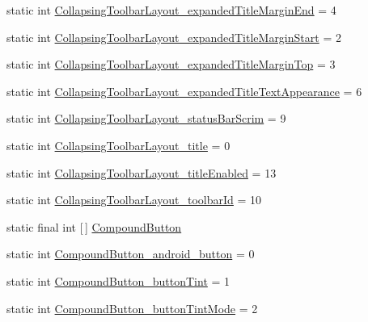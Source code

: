 \begin{DoxyCompactItemize}
\item 
static int \hyperlink{classandroid_1_1support_1_1v7_1_1cardview_1_1R_1_1styleable_a9ba764a19d59fb616535b8b928a3ab0c}{Collapsing\+Toolbar\+Layout\+\_\+expanded\+Title\+Margin\+End} = 4
\item 
static int \hyperlink{classandroid_1_1support_1_1v7_1_1cardview_1_1R_1_1styleable_a9da9e2540ee41e2bf5cf6e02ca2d940f}{Collapsing\+Toolbar\+Layout\+\_\+expanded\+Title\+Margin\+Start} = 2
\item 
static int \hyperlink{classandroid_1_1support_1_1v7_1_1cardview_1_1R_1_1styleable_adb4d112ba91dd0c5abf011eb88af2a2b}{Collapsing\+Toolbar\+Layout\+\_\+expanded\+Title\+Margin\+Top} = 3
\item 
static int \hyperlink{classandroid_1_1support_1_1v7_1_1cardview_1_1R_1_1styleable_a216b5b490333f10034ece0d07367bcf2}{Collapsing\+Toolbar\+Layout\+\_\+expanded\+Title\+Text\+Appearance} = 6
\item 
static int \hyperlink{classandroid_1_1support_1_1v7_1_1cardview_1_1R_1_1styleable_ac95b8a59eb9582467255c194e9d8546c}{Collapsing\+Toolbar\+Layout\+\_\+status\+Bar\+Scrim} = 9
\item 
static int \hyperlink{classandroid_1_1support_1_1v7_1_1cardview_1_1R_1_1styleable_a7bb1d248c841d16154184e1f8bbc0581}{Collapsing\+Toolbar\+Layout\+\_\+title} = 0
\item 
static int \hyperlink{classandroid_1_1support_1_1v7_1_1cardview_1_1R_1_1styleable_ac3162e6203b6488dcc98da969976ddda}{Collapsing\+Toolbar\+Layout\+\_\+title\+Enabled} = 13
\item 
static int \hyperlink{classandroid_1_1support_1_1v7_1_1cardview_1_1R_1_1styleable_aa0ae88a0aabadbd92010e714caca1dd0}{Collapsing\+Toolbar\+Layout\+\_\+toolbar\+Id} = 10
\item 
static final int \mbox{[}$\,$\mbox{]} \hyperlink{classandroid_1_1support_1_1v7_1_1cardview_1_1R_1_1styleable_a4e5dd24a739b20fb1bfbda95e04d1d75}{Compound\+Button}
\item 
static int \hyperlink{classandroid_1_1support_1_1v7_1_1cardview_1_1R_1_1styleable_a66228106fdc1cf9fd3fa56bd70058c1d}{Compound\+Button\+\_\+android\+\_\+button} = 0
\item 
static int \hyperlink{classandroid_1_1support_1_1v7_1_1cardview_1_1R_1_1styleable_a7295e2bf20744e3120536704e8484f05}{Compound\+Button\+\_\+button\+Tint} = 1
\item 
static int \hyperlink{classandroid_1_1support_1_1v7_1_1cardview_1_1R_1_1styleable_a2ca542fc884ad767a454fac8fce935bb}{Compound\+Button\+\_\+button\+Tint\+Mode} = 2

\end{DoxyCompactItemize}
